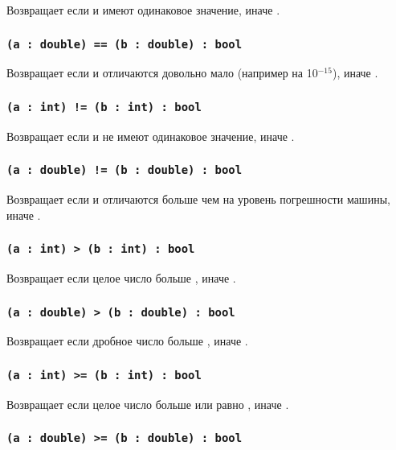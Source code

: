 Возвращает \true{} если  и  имеют одинаковое значение, иначе \false{}.

\subsubsection{\lstinline|(a : double) == (b : double) : bool|}

Возвращает \true{} если  и  отличаются довольно мало (например на 10$^{-15}$), иначе \false{}.

\subsubsection{\lstinline|(a : int) != (b : int) : bool|}

Возвращает \true{} если  и  не имеют одинаковое значение, иначе \false{}.

\subsubsection{\lstinline|(a : double) != (b : double) : bool|}

Возвращает \true{} если  и  отличаются больше чем на уровень погрешности машины, иначе \false{}.

\subsubsection{\lstinline|(a : int) > (b : int) : bool|}

Возвращает \true{} если целое число  больше , иначе \false{}.

\subsubsection{\lstinline|(a : double) > (b : double) : bool|}

Возвращает \true{} если дробное число  больше , иначе \false{}.

\subsubsection{\lstinline|(a : int) >= (b : int) : bool|}

Возвращает \true{} если целое число  больше или равно , иначе \false{}.

\subsubsection{\lstinline|(a : double) >= (b : double) : bool|}

